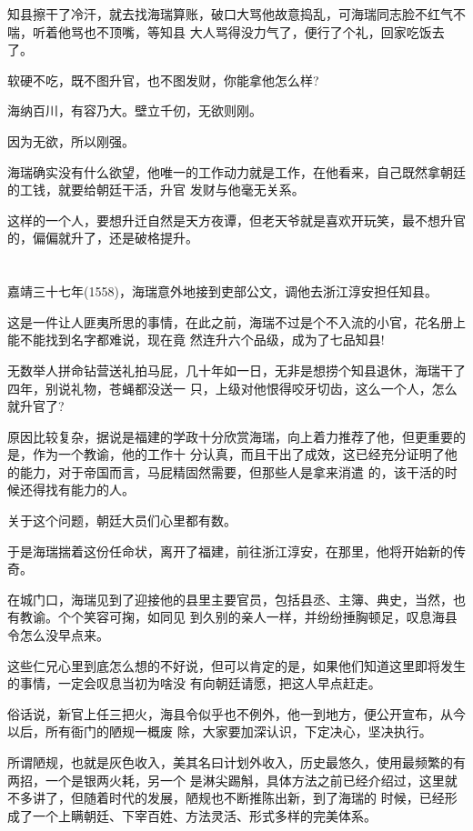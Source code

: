 \documentclass[11pt,a4paper,onecolumn]{article}
\begin{document}
知县擦干了冷汗，就去找海瑞算账，破口大骂他故意捣乱，可海瑞同志脸不红气不喘，听着他骂也不顶嘴，等知县
大人骂得没力气了，便行了个礼，回家吃饭去了。

软硬不吃，既不图升官，也不图发财，你能拿他怎么样?

海纳百川，有容乃大。壁立千仞，无欲则刚。

因为无欲，所以刚强。

海瑞确实没有什么欲望，他唯一的工作动力就是工作，在他看来，自己既然拿朝廷的工钱，就要给朝廷干活，升官
发财与他毫无关系。

这样的一个人，要想升迁自然是天方夜谭，但老天爷就是喜欢开玩笑，最不想升官的，偏偏就升了，还是破格提升。

\section[\thesection]{}

嘉靖三十七年(1558)，海瑞意外地接到吏部公文，调他去浙江淳安担任知县。

这是一件让人匪夷所思的事情，在此之前，海瑞不过是个不入流的小官，花名册上能不能找到名字都难说，现在竟
然连升六个品级，成为了七品知县!

无数举人拼命钻营送礼拍马屁，几十年如一日，无非是想捞个知县退休，海瑞干了四年，别说礼物，苍蝇都没送一
只，上级对他恨得咬牙切齿，这么一个人，怎么就升官了?

原因比较复杂，据说是福建的学政十分欣赏海瑞，向上着力推荐了他，但更重要的是，作为一个教谕，他的工作十
分认真，而且干出了成效，这已经充分证明了他的能力，对于帝国而言，马屁精固然需要，但那些人是拿来消遣
的，该干活的时候还得找有能力的人。

关于这个问题，朝廷大员们心里都有数。

于是海瑞揣着这份任命状，离开了福建，前往浙江淳安，在那里，他将开始新的传奇。

在城门口，海瑞见到了迎接他的县里主要官员，包括县丞、主簿、典史，当然，也有教谕。个个笑容可掬，如同见
到久别的亲人一样，并纷纷捶胸顿足，叹息海县令怎么没早点来。

这些仁兄心里到底怎么想的不好说，但可以肯定的是，如果他们知道这里即将发生的事情，一定会叹息当初为啥没
有向朝廷请愿，把这人早点赶走。

俗话说，新官上任三把火，海县令似乎也不例外，他一到地方，便公开宣布，从今以后，所有衙门的陋规一概废
除，大家要加深认识，下定决心，坚决执行。

所谓陋规，也就是灰色收入，美其名曰计划外收入，历史最悠久，使用最频繁的有两招，一个是银两火耗，另一个
是淋尖踢斛，具体方法之前已经介绍过，这里就不多讲了，但随着时代的发展，陋规也不断推陈出新，到了海瑞的
时候，已经形成了一个上瞒朝廷、下宰百姓、方法灵活、形式多样的完美体系。
\end{document}
